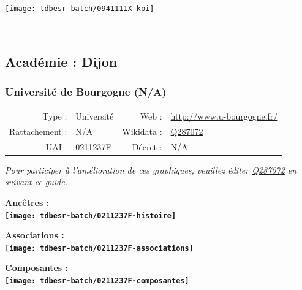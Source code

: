 \documentclass[12pt,french,]{article}
\begin{document}
\begin{center}\texttt{[image: tdbesr-batch/0941111X-kpi]} \end{center}\checkoddpage

\ifoddpage \fi ~\newpage  

\hypertarget{acaduxe9mie-dijon}{%
\subsection{Académie : Dijon}\label{acaduxe9mie-dijon}}

\hypertarget{universituxe9-de-bourgogne-na}{%
\subsubsection{Université de Bourgogne
(N/A)}\label{universituxe9-de-bourgogne-na}}

\begin{tabular*}{\textwidth}{rp{5cm}rl}  
\hline  
Type : & Université & Web : &\href{http://www.u-bourgogne.fr/}{http://www.u-bourgogne.fr/} \\  
Rattachement : & N/A & Wikidata : & \href{https://www.wikidata.org/entity/Q287072}{Q287072} \\  
UAI : & 0211237F & Décret : & N/A \\  
\hline  
\end{tabular*}

\textit{\scriptsize Pour participer à l'amélioration de ces graphiques, veuillez éditer  \href{https://www.wikidata.org/entity/Q287072}{Q287072}  en suivant \href{https://github.com/cpesr/wikidataESR/blob/master/Rmd/wikidataESR.md}{ce guide.}}

\vspace{1cm}  
\begin{minipage}[b]{0.50\textwidth}\begin{center} \bf Ancêtres : \\  
\texttt{[image: tdbesr-batch/0211237F-histoire]} \end{center}\end{minipage}\begin{minipage}[b]{0.50\textwidth}\begin{center} \bf Associations : \\  
\texttt{[image: tdbesr-batch/0211237F-associations]} \end{center}\end{minipage}

\hrulefill

\begin{center} \bf Composantes : \\  
\texttt{[image: tdbesr-batch/0211237F-composantes]} \end{center}
\end{document}

